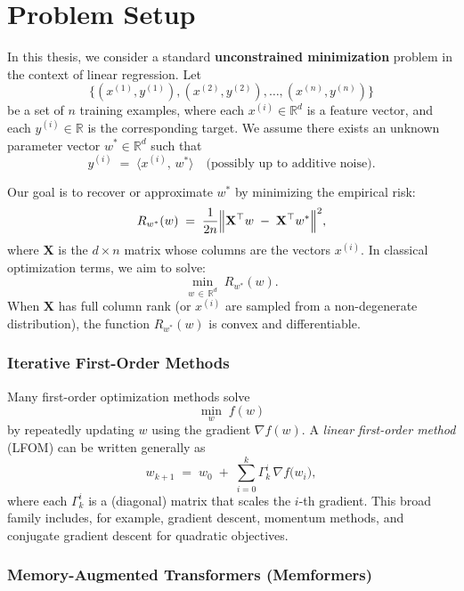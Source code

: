 \chapter{Problem Setup}
\label{sec:Chapter1} 

In this thesis, we consider a standard \textbf{unconstrained minimization} problem in the context of linear regression. Let
\[
  \{(x^{(1)}, y^{(1)}), (x^{(2)}, y^{(2)}), \dots, (x^{(n)}, y^{(n)})\}
\]
be a set of $n$ training examples, where each $x^{(i)} \in \mathbb{R}^d$ is a feature vector, and each $y^{(i)} \in \mathbb{R}$ is the corresponding target. We assume there exists an unknown parameter vector $w^* \in \mathbb{R}^d$ such that 
\[
  y^{(i)} \;=\; \langle x^{(i)}, \, w^* \rangle 
  \quad \text{(possibly up to additive noise).}
\]

Our goal is to recover or approximate $w^*$ by minimizing the empirical risk:
\begin{equation}
  \label{eq:empirical-risk}
  R_{w^*}(w) \;=\; \frac{1}{2n} \Bigl\|\mathbf{X}^{\top} w \;-\; \mathbf{X}^{\top} w^*\Bigr\|^2,
\end{equation}
where $\mathbf{X}$ is the $d \times n$ matrix whose columns are the vectors $x^{(i)}$. 
In classical optimization terms, we aim to solve:
\[
  \min_{w \,\in\, \mathbb{R}^d}\; R_{w^*}(w).
\]
When $\mathbf{X}$ has full column rank (or $x^{(i)}$ are sampled from a non-degenerate distribution), 
the function $R_{w^*}(w)$ is convex and differentiable.

\subsection{Iterative First-Order Methods}

Many first-order optimization methods solve
\[
  \min_{w}\; f(w)
\]
by repeatedly updating $w$ using the gradient $\nabla f(w)$. A \emph{linear first-order method} (LFOM) 
can be written generally as
\begin{equation}
  \label{eq:LFOM}
  w_{k+1} \;=\; w_0 \;+\; \sum_{i=0}^{k}\Gamma_k^i\,\nabla f\bigl(w_i\bigr),
\end{equation}
where each $\Gamma_k^i$ is a (diagonal) matrix that scales the $i$-th gradient. This broad family includes, for example, gradient descent, momentum methods, and conjugate gradient descent for quadratic objectives.

\subsection{Memory-Augmented Transformers (Memformers)}

